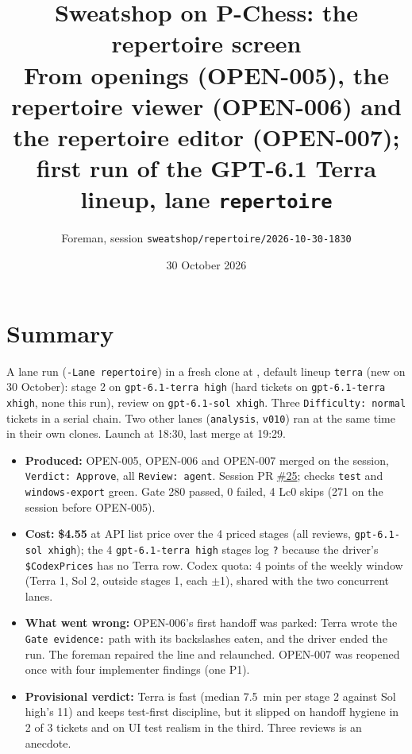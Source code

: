 \documentclass[11pt,a4paper]{article}
\title{Sweatshop on P-Chess: the repertoire screen\\\large From openings (OPEN-005), the repertoire viewer (OPEN-006) and the repertoire editor (OPEN-007); first run of the GPT-6.1 Terra lineup, lane \texttt{repertoire}}
\author{Foreman, session \texttt{sweatshop/repertoire/2026-10-30-1830}}
\date{30 October 2026}
\begin{document}
\maketitle

\section*{Summary}

A lane run (\texttt{-Lane repertoire}) in a fresh clone at ,
default lineup \texttt{terra} (new on 30 October): stage 2 on \texttt{gpt-6.1-terra high} (hard
tickets on \texttt{gpt-6.1-terra xhigh}, none this run), review on \texttt{gpt-6.1-sol xhigh}.
Three \texttt{Difficulty: normal} tickets in a serial chain. Two other lanes (\texttt{analysis},
\texttt{v010}) ran at the same time in their own clones. Launch at 18:30, last merge at 19:29.

\begin{itemize}
  \item \textbf{Produced:} OPEN-005, OPEN-006 and OPEN-007 merged on the session,
        \texttt{Verdict: Approve}, all \texttt{Review: agent}. Session PR
        \href{https://github.com/Laginho/P-Chess/pull/25}{\#25}; checks \texttt{test} and
        \texttt{windows-export} green. Gate 280 passed, 0 failed, 4 Lc0 skips (271 on the
        session before OPEN-005).
  \item \textbf{Cost:} \textbf{\$4.55} at API list price over the 4 priced stages (all reviews,
        \texttt{gpt-6.1-sol xhigh}); the 4 \texttt{gpt-6.1-terra high} stages log \texttt{?}
        because the driver's \texttt{\$CodexPrices} has no Terra row. Codex quota: 4 points of
        the weekly window (Terra 1, Sol 2, outside stages 1, each $\pm$1), shared with the
        two concurrent lanes.
  \item \textbf{What went wrong:} OPEN-006's first handoff was parked: Terra wrote the
        \texttt{Gate evidence:} path with its backslashes eaten, and the driver ended the run.
        The foreman repaired the line and relaunched. OPEN-007 was reopened once with four
        implementer findings (one P1).
  \item \textbf{Provisional verdict:} Terra is fast (median 7.5~min per stage 2 against Sol
        high's 11) and keeps test-first discipline, but it slipped on handoff hygiene in 2 of 3
        tickets and on UI test realism in the third. Three reviews is an anecdote.
\end{itemize}
\end{document}
